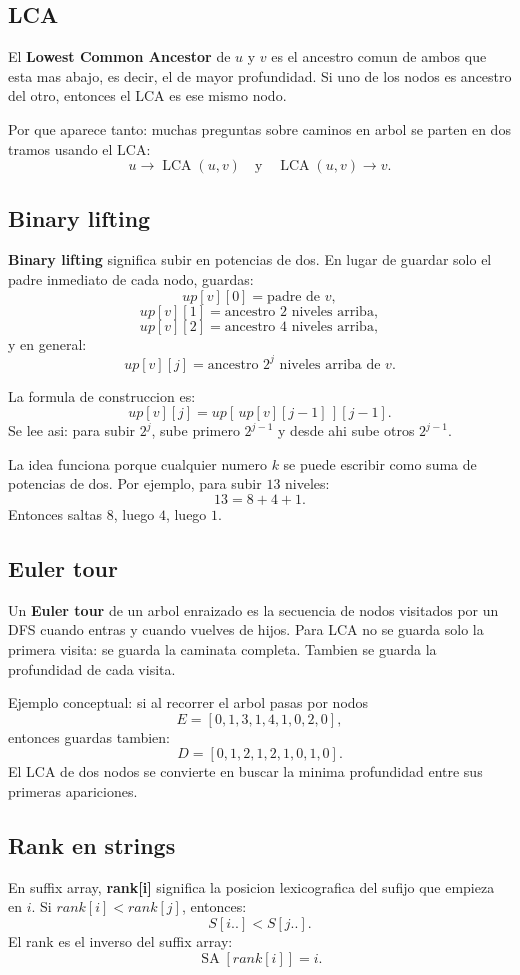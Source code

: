 \documentclass[10pt]{article}
\newcommand{\LCA}{\operatorname{LCA}}
\newcommand{\SA}{\operatorname{SA}}
\begin{document}
\subsection{LCA}
El \textbf{Lowest Common Ancestor} de $u$ y $v$ es el ancestro comun de ambos
que esta mas abajo, es decir, el de mayor profundidad. Si uno de los nodos es
ancestro del otro, entonces el LCA es ese mismo nodo.

Por que aparece tanto: muchas preguntas sobre caminos en arbol se parten en dos
tramos usando el LCA:
\[
u\to \LCA(u,v)\quad\text{y}\quad \LCA(u,v)\to v.
\]

\subsection{Binary lifting}
\textbf{Binary lifting} significa subir en potencias de dos. En lugar de guardar
solo el padre inmediato de cada nodo, guardas:
\[
up[v][0]=\text{padre de }v,
\]
\[
up[v][1]=\text{ancestro }2\text{ niveles arriba},
\]
\[
up[v][2]=\text{ancestro }4\text{ niveles arriba},
\]
y en general:
\[
up[v][j]=\text{ancestro }2^j\text{ niveles arriba de }v.
\]

La formula de construccion es:
\[
up[v][j]=up[\,up[v][j-1]\,][j-1].
\]
Se lee asi: para subir $2^j$, sube primero $2^{j-1}$ y desde ahi sube otros
$2^{j-1}$.

La idea funciona porque cualquier numero $k$ se puede escribir como suma de
potencias de dos. Por ejemplo, para subir $13$ niveles:
\[
13=8+4+1.
\]
Entonces saltas $8$, luego $4$, luego $1$.

\subsection{Euler tour}
Un \textbf{Euler tour} de un arbol enraizado es la secuencia de nodos visitados
por un DFS cuando entras y cuando vuelves de hijos. Para LCA no se guarda solo
la primera visita: se guarda la caminata completa. Tambien se guarda la
profundidad de cada visita.

Ejemplo conceptual: si al recorrer el arbol pasas por nodos
\[
E=[0,1,3,1,4,1,0,2,0],
\]
entonces guardas tambien:
\[
D=[0,1,2,1,2,1,0,1,0].
\]
El LCA de dos nodos se convierte en buscar la minima profundidad entre sus
primeras apariciones.

\subsection{Rank en strings}
En suffix array, \textbf{rank[i]} significa la posicion lexicografica del sufijo
que empieza en $i$. Si $rank[i]<rank[j]$, entonces:
\[
S[i..] < S[j..].
\]
El rank es el inverso del suffix array:
\[
\SA[rank[i]]=i.
\]
\end{document}
